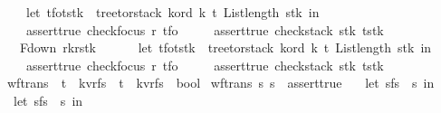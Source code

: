\begin{isabellebody}
\ \ \ \ let\ {\isacharparenleft}t{\isacharunderscore}fo{\isacharcomma}t{\isacharunderscore}stk{\isacharparenright}\ {\isacharequal}\ tree{\isacharunderscore}to{\isacharunderscore}rstack\ k{\isacharunderscore}ord\ k\ t{}\ {\isacharparenleft}List{\isachardot}length\ stk{\isacharparenright}\ in\isanewline
\ \ \ \ assert{\isacharunderscore}true\ {\isacharparenleft}check{\isacharunderscore}focus\ r\ t{\isacharunderscore}fo{\isacharparenright}\ {\isacharampersand}\isanewline
\ \ \ \ assert{\isacharunderscore}true\ {\isacharparenleft}check{\isacharunderscore}stack\ stk\ t{\isacharunderscore}stk{\isacharparenright}{\isacharparenright}\isanewline
\ \ {\isacharbar}\ F{\isacharunderscore}down\ {\isacharparenleft}r{}{\isacharcomma}k{\isacharcomma}r{\isacharcomma}stk{\isacharparenright}\ {\isasymRightarrow}\ {\isacharparenleft}\isanewline
\ \ \ \ let\ {\isacharparenleft}t{\isacharunderscore}fo{\isacharcomma}t{\isacharunderscore}stk{\isacharparenright}\ {\isacharequal}\ tree{\isacharunderscore}to{\isacharunderscore}rstack\ k{\isacharunderscore}ord\ k\ t{}\ {\isacharparenleft}List{\isachardot}length\ stk{\isacharparenright}\ in\isanewline
\ \ \ \ assert{\isacharunderscore}true\ {\isacharparenleft}check{\isacharunderscore}focus\ r\ t{\isacharunderscore}fo{\isacharparenright}\ {\isacharampersand}\isanewline
\ \ \ \ assert{\isacharunderscore}true\ {\isacharparenleft}check{\isacharunderscore}stack\ stk\ t{\isacharunderscore}stk{\isacharparenright}\ {\isacharparenright}{\isacharparenright}{\isachardoublequoteclose}\isanewline
\isanewline
\isanewline
\isanewline
\isanewline
\isanewline
\isanewline
\isanewline
\isanewline
{}\isamarkupfalse%
\ wf{\isacharunderscore}trans\ {\isacharcolon}{\isacharcolon}\ {\isachardoublequoteopen}{\isacharprime}t\ {\isacharasterisk}\ {\isacharparenleft}{\isacharprime}k{\isacharcomma}{\isacharprime}v{\isacharcomma}{\isacharprime}r{\isacharparenright}fs\ {\isasymRightarrow}\ {\isacharprime}t\ {\isacharasterisk}\ {\isacharparenleft}{\isacharprime}k{\isacharcomma}{\isacharprime}v{\isacharcomma}{\isacharprime}r{\isacharparenright}fs\ {\isasymRightarrow}\ bool{\isachardoublequoteclose}\ \isanewline
{\isachardoublequoteopen}wf{\isacharunderscore}trans\ s{}\ s{}\ {\isacharequal}\ assert{\isacharunderscore}true\ {\isacharparenleft}\isanewline
\ \ let\ {\isacharparenleft}s{}{\isacharcomma}fs{}{\isacharparenright}\ {\isacharequal}\ s{}\ in\isanewline
\ \ let\ {\isacharparenleft}s{}{\isacharcomma}fs{}{\isacharparenright}\ {\isacharequal}\ s{}\ in\isanewline

\end{isabellebody}

